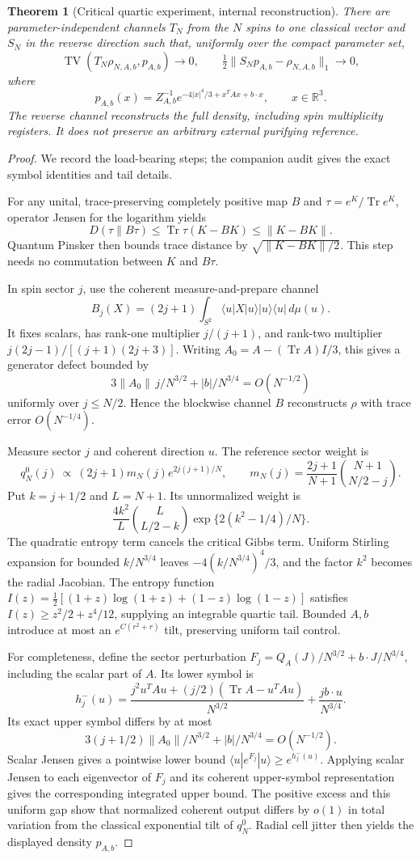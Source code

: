 \documentclass[11pt]{article}
\newtheorem{theorem}{Theorem}[section]
\newcommand{\Tr}{\operatorname{Tr}}
\newcommand{\TV}{\operatorname{TV}}
\newcommand{\ket}[1]{|#1\rangle}
\newcommand{\bra}[1]{\langle#1|}
\newcommand{\R}{\mathbb R}
\begin{document}
\begin{theorem}[Critical quartic experiment, internal reconstruction]
There are parameter-independent channels $T_N$ from the $N$ spins to one classical vector and $S_N$ in the reverse direction such that, uniformly over the compact parameter set,
\[
 \TV(T_N\rho_{N,A,b},p_{A,b})\longrightarrow0,
 \qquad \tfrac12\|S_Np_{A,b}-\rho_{N,A,b}\|_1\longrightarrow0,
\]
where
\[
 p_{A,b}(x)=Z_{A,b}^{-1}
 e^{-4|x|^4/3+x^TAx+b\cdot x},\qquad x\in\R^3.
\]
The reverse channel reconstructs the full density, including spin multiplicity registers. It does not preserve an arbitrary external purifying reference.
\end{theorem}
\begin{proof}
We record the load-bearing steps; the companion audit gives the exact symbol identities and tail details.

For any unital, trace-preserving completely positive map $B$ and $\tau=e^K/\Tr e^K$, operator Jensen for the logarithm yields
\[
 D(\tau\|B\tau)\leq\Tr\tau(K-BK)\leq\|K-BK\|.
\]
Quantum Pinsker then bounds trace distance by $\sqrt{\|K-BK\|/2}$. This step needs no commutation between $K$ and $B\tau$.

In spin sector $j$, use the coherent measure-and-prepare channel
\[
 B_j(X)=(2j+1)\int_{S^2}\bra uX\ket u\ket u\bra u\,d\mu(u).
\]
It fixes scalars, has rank-one multiplier $j/(j+1)$, and rank-two multiplier $j(2j-1)/[(j+1)(2j+3)]$. Writing $A_0=A-(\Tr A)I/3$, this gives a generator defect bounded by
\[
 3\|A_0\|\,j/N^{3/2}+|b|/N^{3/4}=O(N^{-1/2})
\]
uniformly over $j\leq N/2$. Hence the blockwise channel $B$ reconstructs $\rho$ with trace error $O(N^{-1/4})$.

Measure sector $j$ and coherent direction $u$. The reference sector weight is
\[
 q_N^0(j)\ \propto\ (2j+1)m_N(j)e^{2j(j+1)/N},\qquad
 m_N(j)=\frac{2j+1}{N+1}\binom{N+1}{N/2-j}.
\]
Put $k=j+1/2$ and $L=N+1$. Its unnormalized weight is
\[
 \frac{4k^2}{L}\binom{L}{L/2-k}\exp\{2(k^2-1/4)/N\}.
\]
The quadratic entropy term cancels the critical Gibbs term. Uniform Stirling expansion for bounded $k/N^{3/4}$ leaves $-4(k/N^{3/4})^4/3$, and the factor $k^2$ becomes the radial Jacobian. The entropy function $I(z)=\tfrac12[(1+z)\log(1+z)+(1-z)\log(1-z)]$ satisfies $I(z)\geq z^2/2+z^4/12$, supplying an integrable quartic tail. Bounded $A,b$ introduce at most an $e^{C(r^2+r)}$ tilt, preserving uniform tail control.

For completeness, define the sector perturbation $F_j=Q_A(J)/N^{3/2}+b\cdot J/N^{3/4}$, including the scalar part of $A$. Its lower symbol is
\[
 h_j^-(u)=\frac{j^2u^TAu+(j/2)(\Tr A-u^TAu)}{N^{3/2}}
 +\frac{j b\cdot u}{N^{3/4}}.
\]
Its exact upper symbol differs by at most
\[
 3(j+1/2)\|A_0\|/N^{3/2}+|b|/N^{3/4}=O(N^{-1/2}).
\]
Scalar Jensen gives a pointwise lower bound $\bra u e^{F_j}\ket u\geq e^{h_j^-(u)}$. Applying scalar Jensen to each eigenvector of $F_j$ and its coherent upper-symbol representation gives the corresponding integrated upper bound. The positive excess and this uniform gap show that normalized coherent output differs by $o(1)$ in total variation from the classical exponential tilt of $q_N^0$. Radial cell jitter then yields the displayed density $p_{A,b}$.


\end{proof}
\end{document}
